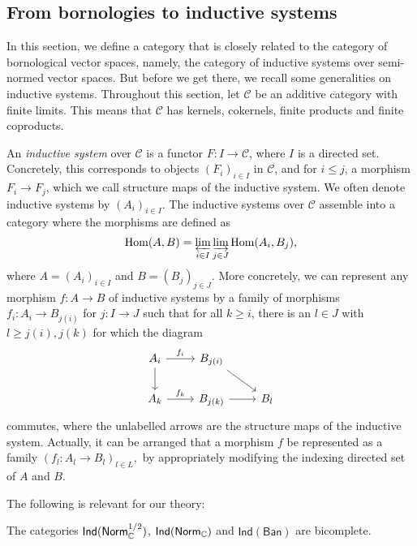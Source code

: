 
\subsection{From bornologies to inductive systems}

In this section, we define a category that is closely related to the category of bornological vector spaces, namely, the category of inductive systems over semi-normed vector spaces. But before we get there, we recall some generalities on inductive systems. Throughout this section, let \(\mathcal{C}\) be an additive category with finite limits. This means that \(\mathcal{C}\) has kernels, cokernels, finite products and finite coproducts. 

An \textit{inductive system} over \(\mathcal{C}\) is a functor \(F \colon I \to \mathcal{C}\), where \(I\) is a directed set. Concretely, this corresponds to objects \((F_i)_{i \in I}\) in \(\mathcal{C}\), and for \(i \leq j\), a morphism \(F_i \to F_j\), which we call structure maps of the inductive system. We often denote inductive systems by \((A_i)_{i \in I}\). The inductive systems over \(\mathcal{C}\) assemble into a category where the morphisms are defined as \[\operatorname{Hom}(A,B) = \varprojlim_{i \in I} \varinjlim_{j \in J} \operatorname{Hom}(A_i,B_j),\] where \(A = (A_i)_{i \in I}\) and \(B = (B_j)_{j \in J}\). More concretely, we can represent any morphism \(f \colon A \to B\) of inductive systems by a family of morphisms \(f_i \colon A_i \to B_{j(i)}\) for \(j \colon I \to J\) such that for all \(k \geq i\), there is an \(l \in J\) with \(l \geq j(i), j(k)\) for which the  diagram  
\[
\begin{tikzcd}
A_i \arrow{r}{f_i} \arrow{d}{} & B_{j(i)} \arrow{dr}{} & \\
A_k \arrow{r}{f_k} & B_{j(k)} \arrow{r}{} & B_l
\end{tikzcd}
\] commutes, where the unlabelled arrows are the structure maps of the inductive system. Actually, it can be arranged that a morphism \(f\) be represented as a family \((f_l \colon A_l \to B_l)_{l \in L},\) by appropriately modifying the indexing directed set of \(A\) and \(B\). 

The following is relevant for our theory:

\begin{theorem}
The categories \(\mathsf{Ind}(\mathsf{Norm}_\mathbb C^{1/2})\), \(\mathsf{Ind}(\mathsf{Norm}_\mathbb C)\) and \(\mathsf{Ind}(\mathsf{Ban})\) are bicomplete.
\end{theorem}

